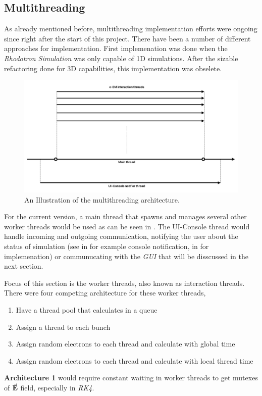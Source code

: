\documentclass[a4paper,oneside,12pt]{report}
\numberwithin{equation}{chapter}
\begin{document}
\subsection{Multithreading}
As already mentioned before, multithreading implementation efforts were ongoing since right after the start of this project. 
There have been a number of different approaches for implementation. 
First implemenation was done when the \textit{Rhodotron Simulation} was only capable of 1D simulations.
After the sizable refactoring done for 3D capabilities, this implementation was obselete. 
\begin{figure}[H]
    \centering
    \includegraphics[width=\linewidth]{./figures/illustrations/multh_arc.png}
    \caption{An Illustration of the multithreading architecture.}
    \label{fig:multh_illustration}
\end{figure}
For the current version, a main thread that spawns and manages several other worker threads would be used as can be seen in .
The UI-Console thread would handle incoming and outgoing communication, notifying the user about the status of simulation 
(see  in  for example console notification,  in  for implemenation)
or communucating with the \textit{GUI} that will be disscussed in the next section.

Focus of this section is the worker threads, also known as \eEM interaction threads.
There were four competing architecture for these worker threads,
\begin{enumerate}
    \item Have a thread pool that calculates \eEM in a queue 
    \item Assign a thread to each bunch
    \item Assign random electrons to each thread and calculate \eEM with global time
    \item Assign random electrons to each thread and calculate \eEM with local thread time
\end{enumerate}
\textbf{Architecture 1} would require constant waiting in worker threads to get mutexes of $\vec{\textbf{E}}$ field, especially in \textit{RK4}.
\end{document}
